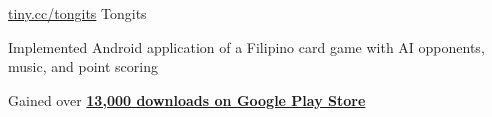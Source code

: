 \documentclass[12pt, letterpaper]{awesome-cv}
\begin{document}
\begin{cventries}

  \cventry
    {\href{http://tiny.cc/tongits}{tiny.cc/tongits}} %
    {Tongits} %
    {} %
    {} %
    {
      \begin{cvitems} %
      	\item {Implemented Android application of a Filipino card game with AI opponents, music, and point scoring}
		    \item 
            Gained over \href{https://play.google.com/store/apps/details?id=com.creativelabs.tongits&hl=en_US/}{\textbf{13,000 downloads on Google Play Store}}
      \end{cvitems}
    }


\end{cventries}
\end{document}
